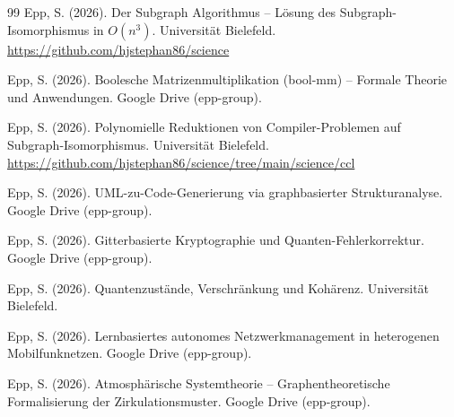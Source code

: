 ﻿\documentclass[a4paper,12pt]{article}
\theoremstyle{definition}
\begin{document}
\begin{thebibliography}{99}
Epp, S. (2026).
Der Subgraph Algorithmus -- L\"osung des Subgraph-Isomorphismus in $O(n^3)$.
Universit\"at Bielefeld.
\url{https://github.com/hjstephan86/science}

Epp, S. (2026).
Boolesche Matrizenmultiplikation (bool-mm) -- Formale Theorie und Anwendungen.
Google Drive (epp-group).

Epp, S. (2026).
Polynomielle Reduktionen von Compiler-Problemen auf Subgraph-Isomorphismus.
Universit\"at Bielefeld.
\url{https://github.com/hjstephan86/science/tree/main/science/ccl}

Epp, S. (2026).
UML-zu-Code-Generierung via graphbasierter Strukturanalyse.
Google Drive (epp-group).

Epp, S. (2026).
Gitterbasierte Kryptographie und Quanten-Fehlerkorrektur.
Google Drive (epp-group).

Epp, S. (2026).
Quantenzust\"ande, Verschr\"ankung und Koh\"arenz.
Universit\"at Bielefeld.

Epp, S. (2026).
Lernbasiertes autonomes Netzwerkmanagement in heterogenen Mobilfunknetzen.
Google Drive (epp-group).

Epp, S. (2026).
Atmosph\"arische Systemtheorie -- Graphentheoretische Formalisierung der
Zirkulationsmuster.
Google Drive (epp-group).

\end{thebibliography}
\end{document}
